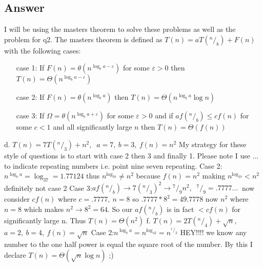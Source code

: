 \documentclass{article}
\newcommand*\rfrac[2]{{}^{#1}\!/_{#2}}
\begin{document}
\subsection*{Answer}
I will be using the masters theorem to solve these problems as well as the problem for q2.
The masters theorem is defined as $\displaystyle T(n)=aT(\rfrac{n}{b})+F(n)$ with the following cases: 
\begin{enumerate}
\item[case 1:] If $F(n)=\theta(n^{\log_ba-\varepsilon})$ for some $\varepsilon > 0$ then $T(n)=\Theta(n^{\log_ba-\varepsilon})$
\item[case 2:] If $F(n)=\theta(n^{\log_ba})$ then $T(n)=\Theta(n^{\log_ba}\log n)$
\item[case 3:] If $\Omega=\theta(n^{\log_ba+\varepsilon})$ for some $\varepsilon > 0$ and if $af(\rfrac{n}{b}) \leq cf(n)$ for some $c < 1$ and all significantly large $n$ then $T(n)=\Theta(f(n))$
\end{enumerate}
d. $T(n)=7T\left(\rfrac{n}{3}\right)+n^2,\ $ $a=7,\ b=3, \ f(n)=n^2$\newline
My strategy for these style of questions is to start with case 2 then 3 and finally 1.\newline
Please note I use $\ldots$ to indicate repeating numbers i.e. point nine seven repeating. 
\newline\newline
Case 2:\newline $n^{\log_ba}=\log_37=1.77124$ thus $n^{\log_37} \neq n^2$ because $f(n)=n^2$ making $n^{\log_37} < n^2$ definitely not case 2\newline\newline
Case 3:\newline $af(\rfrac{n}{b}) \to 7(\rfrac{n}{3})^2 \to \rfrac{7}{9}n^2, \ $ $\rfrac{7}{9}=.7777\ldots \ $ now consider $cf(n)$ where $c=.7777, \ n=8$ so $.7777*8^2=49.7778$ now $n^2$ where $n=8$ which makes $n^2 \to 8^2=64$. So our $af(\rfrac{n}{b})$ is in fact $<cf(n)$ for significantly large n. Thus $T(n)=\Theta(n^2)$\newline \newline
\noindent
f. $T(n)=2T(\rfrac{n}{4})+\sqrt{n}, \ $ $a=2, \ b=4, \ f(n)=\sqrt{n}$\newline\newline
Case 2:\newline $n^{\log_ba}=n^{\log_42}=n^{\rfrac{1}{2}}$ HEY!!!! we know any number to the one half power is equal the square root of the number. By this I declare $T(n)=\Theta(\sqrt{n} \log n)$ ;)
\end{document}

